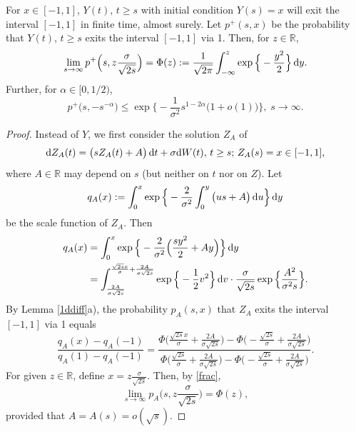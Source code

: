 \documentclass[10pt,a4paper]{amsart}
\def\R{\mathbb R}
\renewcommand{\d}{\hbox{d}}
\begin{document}
\begin{lem}\label{lem2}
  For $x \in [-1,1]$, $Y(t),\,t \geq s$ with initial condition $Y(s)=x$ will exit the interval $[-1,1]$ in finite time, almost surely.   Let $p^+(s,x)$ be the probability that $Y(t)$, $t \geq s$ exits the interval $[-1,1]$ via 1. Then, for $z \in \R$,
  \begin{equation}\label{limm}
\lim_{s \to \infty}p^+\Big(s,z\frac {\sigma}{\sqrt{2s}}\Big)= \Phi(z):=\frac 1{\sqrt{2\pi}}\int_{-\infty}^z\exp\Big\{-\frac{y^2}2 \Big\}\,\d y.
\end{equation}
Further, for $\alpha \in [0,1/2)$,
$$
p^+\big(s,-s^{-\alpha}\big) \leq \exp\Big\{-\frac 1{\sigma^2}s^{1-2\alpha}\big(1+o(1)\big)    \Big\},\;s \to \infty.
$$
\end{lem}

\begin{proof}
  Instead of $Y$, we first consider the solution $Z_A$ of
 \begin{equation}\label{ZZZ}
\d Z_A(t)=\big(sZ_A(t)+A\big)\,\d t +\sigma \d W(t),\,t \geq s;\, Z_A(s)=x \in [-1,1],
\end{equation}
where $A \in \R$ may depend on $s$ (but neither on $t$ nor on $Z$).
Let
$$
q_A(x):=\int_0^x\exp \Big\{-\frac 2{\sigma^2} \int_0^y\big(us+A\big)\,\d u   \Big\}\,\d y
$$
be the scale function of $Z_A$. Then
\begin{align*}
q_A(x)&=\int_0^x \exp \Big\{-\frac 2{\sigma^2} \Big(\frac{sy^2} 2+Ay\Big)   \Big\}\,\d y\\
&=\int_{\frac{2A}{\sigma \sqrt{2s}}}^{\frac {\sqrt{2s}x}\sigma + \frac{2A}{\sigma\sqrt{2s}}} \exp\Big\{-\frac 12 v^2\Big\}\,\d v \cdot \frac \sigma{\sqrt{2s}}  \exp\Big\{\frac {A^2}{\sigma^2 s}\Big\}.
\end{align*}
By Lemma \ref{1ddiff}a), the probability $p_A(s,x)$ that $Z_A$ exits the interval $[-1,1]$ via 1 equals
\begin{equation}\label{frac}
\frac{q_A(x)-q_A(-1)}{q_A(1)-q_A(-1)}=\frac{\Phi\Big( \frac {\sqrt{2s}x}\sigma +\frac{2A}{\sigma \sqrt{2s}}\Big) - \Phi\Big( -\frac {\sqrt{2s}}\sigma +\frac{2A}{\sigma \sqrt{2s}}\Big)}
{\Phi\Big( \frac {\sqrt{2s}}\sigma +\frac{2A}{\sigma \sqrt{2s}}\Big) - \Phi\Big( -\frac {\sqrt{2s}}\sigma +\frac{2A}{\sigma \sqrt{2s}}\Big)}.
\end{equation}
For given $z \in \R$, define $x=z\frac \sigma{\sqrt{2s}}$. Then, by \eqref{frac},
\begin{equation}\label{assame}
\lim_{s \to \infty} p_A\Big(s, z\frac \sigma{\sqrt{2s}}\Big)=\Phi(z),
\end{equation}
provided that $A=A(s)=o(\sqrt{s})$.


\end{proof}
\end{document}
